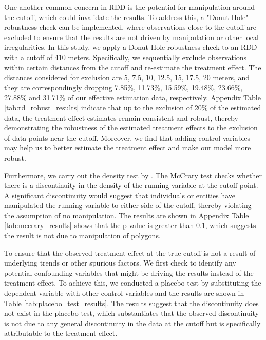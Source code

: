 \documentclass[11pt]{article}
\begin{document}
One another common concern in RDD is the potential for manipulation around the cutoff, which could invalidate the results. To address this, a "Donut Hole" robustness check can be implemented, where observations close to the cutoff are excluded to ensure that the results are not driven by manipulation or other local irregularities. In this study, we apply a Donut Hole robustness check to an RDD with a cutoff of 410 meters. Specifically, we sequentially exclude observations within certain distances from the cutoff and re-estimate the treatment effect. The distances considered for exclusion are 5, 7.5, 10, 12.5, 15, 17.5, 20 meters, and they are correspondingly dropping 7.85\%, 11.73\%, 15.59\%, 19.48\%, 23.66\%, 27.88\% and 31.71\% of our effective estimation data, respectively. Appendix Table \ref{tab:rd_robust_results} indicate that up to the exclusion of 20\% of the estimated data, the treatment effect estimates remain consistent and robust, thereby demonstrating the robustness of the estimated treatment effects to the exclusion of data points near the cutoff. Moreover, we find that adding control variables may help us to better estimate the treatment effect and make our model more robust.

Furthermore, we carry out the density test by \citep{MCCRARY2008698}. The McCrary test checks whether there is a discontinuity in the density of the running variable at the cutoff point. A significant discontinuity would suggest that individuals or entities have manipulated the running variable to either side of the cutoff, thereby violating the assumption of no manipulation. The results are shown in Appendix Table \ref{tab:mccrary_results} shows that the p-value is greater than 0.1, which suggests the result is not due to manipulation of polygons.

To ensure that the observed treatment effect at the true cutoff is not a result of underlying trends or other spurious factors. We first check to identify any potential confounding variables that might be driving the results instead of the treatment effect. To achieve this, we conducted a placebo test by substituting the dependent variable with other control variables and the results are shown in Table \ref{tab:placebo_test_results}. The results suggest that the discontinuity does not exist in the placebo test, which substantiates that the observed discontinuity is not due to any general discontinuity in the data at the cutoff but is specifically attributable to the treatment effect.
\end{document}
